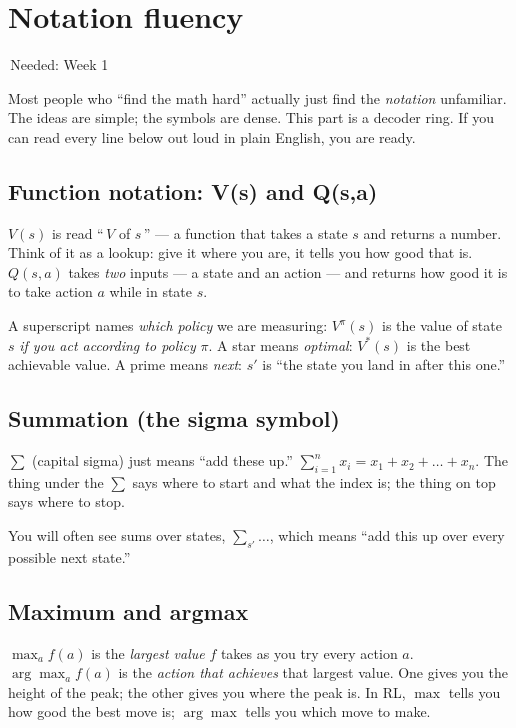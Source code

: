 \documentclass[11pt]{article}
\newcommand{\wk}[1]{{\sffamily\footnotesize\colorbox{slate!12}{\textcolor{slate}{\,Needed: #1\,}}}}
\begin{document}
\section{Notation fluency}
\wk{Week 1}

\vspace{0.4em}
Most people who ``find the math hard'' actually just find the \emph{notation} unfamiliar. The ideas are simple; the symbols are dense. This part is a decoder ring. If you can read every line below out loud in plain English, you are ready.

\subsection{Function notation: V(s) and Q(s,a)}
\begin{intuition}
$V(s)$ is read ``\,$V$ of $s$\,'' — a function that takes a state $s$ and returns a number. Think of it as a lookup: give it where you are, it tells you how good that is. $Q(s,a)$ takes \emph{two} inputs — a state and an action — and returns how good it is to take action $a$ while in state $s$.
\end{intuition}
A superscript names \emph{which policy} we are measuring: $V^\pi(s)$ is the value of state $s$ \emph{if you act according to policy} $\pi$. A star means \emph{optimal}: $V^*(s)$ is the best achievable value. A prime means \emph{next}: $s'$ is ``the state you land in after this one.''

\subsection{Summation (the sigma symbol)}
\begin{intuition}
$\sum$ (capital sigma) just means ``add these up.'' $\sum_{i=1}^{n} x_i = x_1 + x_2 + \dots + x_n$. The thing under the $\sum$ says where to start and what the index is; the thing on top says where to stop.
\end{intuition}
You will often see sums over states, $\sum_{s'} \dots$, which means ``add this up over every possible next state.''

\subsection{Maximum and argmax}
\begin{intuition}
$\max_a f(a)$ is the \emph{largest value} $f$ takes as you try every action $a$. $\arg\max_a f(a)$ is the \emph{action that achieves} that largest value. One gives you the height of the peak; the other gives you where the peak is. In RL, $\max$ tells you how good the best move is; $\arg\max$ tells you which move to make.
\end{intuition}
\end{document}
